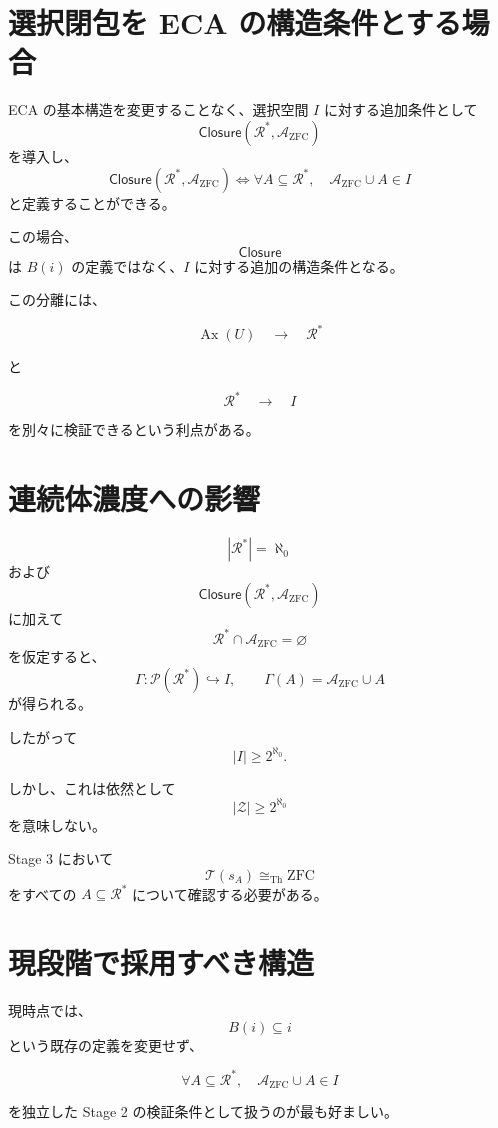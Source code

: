 \documentclass[a4paper,11pt]{article}
\begin{document}
\section{選択閉包を ECA の構造条件とする場合}

ECA の基本構造を変更することなく、選択空間 $I$ に対する追加条件として
\[
\mathsf{Closure}(\mathcal{R}^*,\mathcal{A}_{\mathrm{ZFC}})
\]
を導入し、
\[
\mathsf{Closure}(\mathcal{R}^*,\mathcal{A}_{\mathrm{ZFC}})
\iff
\forall A\subseteq\mathcal{R}^*,
\quad
\mathcal{A}_{\mathrm{ZFC}}\cup A\in I
\]
と定義することができる。

この場合、
\[
\mathsf{Closure}
\]
は $B(i)$ の定義ではなく、$I$ に対する追加の構造条件となる。

この分離には、

\[
\operatorname{Ax}(U)
\quad\longrightarrow\quad
\mathcal{R}^*
\]

と

\[
\mathcal{R}^*
\quad\longrightarrow\quad
I
\]

を別々に検証できるという利点がある。

\section{連続体濃度への影響}

\[
|\mathcal{R}^*|=\aleph_0
\]
および
\[
\mathsf{Closure}(\mathcal{R}^*,\mathcal{A}_{\mathrm{ZFC}})
\]
に加えて
\[
\mathcal{R}^*\cap\mathcal{A}_{\mathrm{ZFC}}=\varnothing
\]
を仮定すると、
\[
\Gamma:
\mathcal{P}(\mathcal{R}^*)\hookrightarrow I,
\qquad
\Gamma(A)=\mathcal{A}_{\mathrm{ZFC}}\cup A
\]
が得られる。

したがって
\[
|I|\ge2^{\aleph_0}.
\]

しかし、これは依然として
\[
|\mathcal{Z}|\ge2^{\aleph_0}
\]
を意味しない。

Stage 3 において
\[
\mathcal{T}(s_A)\cong_{\mathrm{Th}}\mathrm{ZFC}
\]
をすべての $A\subseteq\mathcal{R}^*$ について確認する必要がある。

\section{現段階で採用すべき構造}

現時点では、
\[
B(i)\subseteq i
\]
という既存の定義を変更せず、

\[
\boxed{
\forall A\subseteq\mathcal{R}^*,
\quad
\mathcal{A}_{\mathrm{ZFC}}\cup A\in I
}
\]

を独立した Stage 2 の検証条件として扱うのが最も好ましい。
\end{document}
